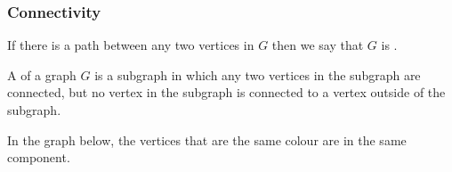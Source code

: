 \documentclass[11pt, mathserif]{beamer}
\theoremstyle{definition}
\theoremstyle{remark}
\begin{document}
\begin{frame}
  \frametitle{Connectivity}

  
\begin{definition}
  If there is a path between any two vertices in $G$ then we say that $G$ is .	
  \end{definition}
  
  \vspace{2\baselineskip}
  \pause
  \begin{definition}
      A  of a graph $G$ is a subgraph in which any two vertices in the subgraph are connected, but no vertex in the subgraph is connected to a vertex outside of the subgraph.
  \end{definition}
  
  \begin{example}
    In the graph below, the vertices that are the same colour are in the same component.
    \begin{center}
      
  
  
  \begin{tikzpicture}[x=0.75pt,y=0.75pt,yscale=-1,xscale=1]
  

\end{tikzpicture}
\end{center}
\end{example}
\end{frame}
\end{document}
